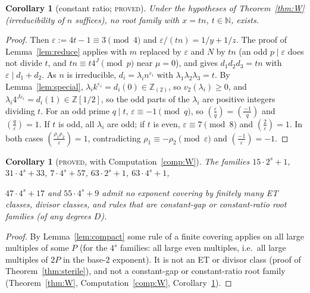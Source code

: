 \documentclass[11pt,reqno]{amsart}
\newtheorem{corollary}[theorem]{Corollary}
\theoremstyle{definition}
\newcommand{\Z}{\mathbb Z}
\newcommand{\N}{\mathbb N}
\newcommand{\leg}[2]{\left(\frac{#1}{#2}\right)}
\newcommand{\status}[1]{\textup{\textsc{#1}}}
\begin{document}
\begin{corollary}[constant ratio; \status{proved}]\label{cor:ratio}
Under the hypotheses of Theorem~\ref{thm:W} \textup{(}irreducibility of $n$
suffices\textup{)}, no root family with $x=tn$, $t\in\N$, exists.
\end{corollary}

\begin{proof}
Then $\varepsilon:=4t-1\equiv3\pmod 4$ and $\varepsilon/(tn)=1/y+1/z$.  The
proof of Lemma~\ref{lem:reduce} applies with $m$ replaced by $\varepsilon$
and $N$ by $tn$ (an odd $p\mid\varepsilon$ does not divide $t$, and
$tn\equiv t4^J\pmod p$ near $\mu=0$), and gives $d_1d_2d_3=tn$ with
$\varepsilon\mid d_1+d_2$.  As $n$ is irreducible, $d_i=\lambda_in^{\varepsilon_i}$
with $\lambda_1\lambda_2\lambda_3=t$.  By Lemma~\ref{lem:special},
$\lambda_ik^{\varepsilon_i}=d_i(0)\in\Z_{(2)}$, so $v_2(\lambda_i)\ge0$,
and $\lambda_i4^{J\varepsilon_i}=d_i(1)\in\Z[1/2]$, so the odd parts of the
$\lambda_i$ are positive integers dividing $t$.  For an odd prime $q\mid t$,
$\varepsilon\equiv-1\pmod q$, so $\leg\varepsilon q=\leg{-1}q$ and
$\leg q\varepsilon=1$.  If $t$ is odd, all $\lambda_i$ are odd; if $t$ is
even, $\varepsilon\equiv7\pmod8$ and $\leg2\varepsilon=1$.  In both cases
$\leg{\rho_1\rho_2}\varepsilon=1$, contradicting $\rho_1\equiv-\rho_2\pmod
\varepsilon$ and $\leg{-1}\varepsilon=-1$.
\end{proof}

\begin{corollary}[\status{proved}, with Computation~\ref{comp:W}]\label{cor:nocover}
The families $15\cdot2^s+1$, $31\cdot4^s+33$, $7\cdot4^s+57$, $63\cdot2^s+1$, $63\cdot4^s+1$,%

$47\cdot4^s+17$ and $55\cdot4^s+9$ admit no exponent covering by finitely
many ET classes, divisor classes, and rules that are constant-gap or
constant-ratio root families \textup{(}of any degrees $D$\textup{)}.
\end{corollary}

\begin{proof}
By Lemma~\ref{lem:compact} some rule of a finite covering applies on all
large multiples of some $P$ (for the $4^s$ families: all large even
multiples, i.e.\ all large multiples of $2P$ in the base-$2$ exponent).
It is not an ET or divisor class (proof of Theorem~\ref{thm:sterile}), and
not a constant-gap or constant-ratio root family (Theorem~\ref{thm:W},
Computation~\ref{comp:W}, Corollary~\ref{cor:ratio}).
\end{proof}
\end{document}
